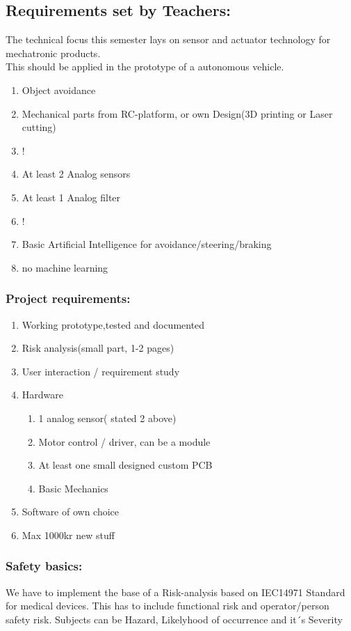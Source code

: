 \documentclass[../report.tex]{subfiles}
\begin{document}
\subsection{Requirements set by Teachers:}
The technical focus this semester lays on sensor and actuator technology for mechatronic products.
\\
This should be applied in the prototype of a autonomous vehicle.
\begin{enumerate}
    \item Object avoidance
    \item Mechanical parts from RC-platform, or own Design(3D printing or Laser cutting)
    \item !
    \item At least 2 Analog sensors
    \item At least 1 Analog filter
    \item !
    \item Basic Artificial Intelligence for avoidance/steering/braking
    \item no machine learning
\end{enumerate}
\subsubsection{Project requirements:}
\begin{enumerate}
    \item Working prototype,tested and documented
    \item Risk analysis(small part, 1-2 pages)
    \item User interaction / requirement study
    \item Hardware\begin{enumerate}
        \item 1 analog sensor( stated 2 above)
        \item Motor control / driver, can be a module
        \item At least one small designed custom PCB
        \item Basic Mechanics

    \end{enumerate}
    \item Software of own choice
    \item Max 1000kr new stuff
\end{enumerate}
\subsubsection{Safety basics:}
We have to implement the base of a Risk-analysis based on IEC14971 Standard for medical devices.
This has to include functional risk and operator/person safety risk. Subjects can be Hazard, Likelyhood
of occurrence and it´s Severity
\end{document}
